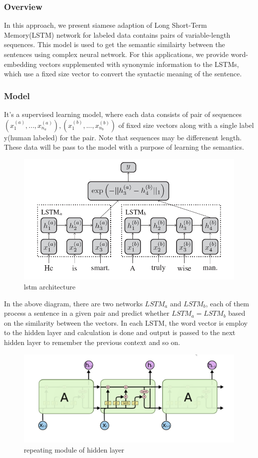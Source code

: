 
\subsubsection{Overview}
In this approach, we present  siamese adaption of Long Short-Term Memory(LSTM) network for labeled data contains pairs of variable-length sequences. This model is used to get the semantic similairty between the sentences using complex neural network. For this applications, we provide word-embedding vectors supplemented with synonymic information to the LSTMs, which use a fixed size vector to convert the syntactic meaning of the sentence. 

\subsubsection{Model}
It's a supervised learning model, where each data consists of pair of sequences $(x_1^{(a)},...,x_{n_a}^{(a)}), (x_1^{(b)},...,x_{n_b}^{(b)})$ of fixed size vectors along with a single label y(human labeled) for the pair. Note that sequences may be differenent length. These data will be pass to the model with a purpose of learning the semantics. 
 \begin{figure}[h]
    \centering
    \includegraphics[width=.75\textwidth]{lstm_image}
    \caption{lstm architecture}
\end{figure}
In the above diagram, there are two networks $LSTM_a$ and $LSTM_b$, each of them process a sentence in a given pair and predict whether  $LSTM_a=LSTM_b$ based on the similarity between the vectors. In each LSTM, the word vector is employ to the hidden layer and calculation is done and output is passed to the next hidden layer to remember the previous context and so on.
 \begin{figure}[h]
    \centering
    \includegraphics[width=.85\textwidth]{hidden_layer}
    \caption{repeating module of hidden layer}
\end{figure}
